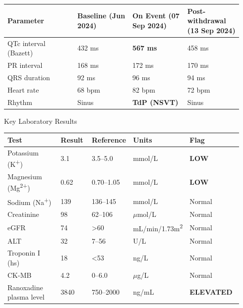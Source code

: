 \documentclass[11pt,a4paper]{scrartcl}
\begin{document}
\begin{tabular}{@{}L{0.28\linewidth}L{0.22\linewidth}L{0.22\linewidth}L{0.22\linewidth}@{}}
\toprule
{}
\small\bfseries Parameter & \small\bfseries Baseline (Jun 2024) & \small\bfseries On Event (07 Sep 2024) & \small\bfseries Post-withdrawal (13 Sep 2024) \\
\midrule
QTc interval (Bazett) & 432 ms & \textbf{\textcolor{AlertRed}{567 ms}} & 458 ms \\
PR interval & 168 ms & 172 ms & 170 ms \\
QRS duration & 92 ms & 96 ms & 94 ms \\
Heart rate & 68 bpm & 82 bpm & 72 bpm \\
Rhythm & Sinus & \textcolor{AlertRed}{\textbf{TdP (NSVT)}} & Sinus \\
\bottomrule
\end{tabular}

\vspace{4mm}

\begin{subsecbox}{Key Laboratory Results}
\end{subsecbox}
\vspace{2mm}

\begin{tabular}{@{}L{0.28\linewidth}L{0.14\linewidth}L{0.14\linewidth}L{0.14\linewidth}L{0.24\linewidth}@{}}
\toprule
{}
\small\bfseries Test & \small\bfseries Result & \small\bfseries Reference & \small\bfseries Units & \small\bfseries Flag \\
\midrule
Potassium (K\textsuperscript{+}) & 3.1 & 3.5--5.0 & mmol/L & \textcolor{AlertRed}{\bfseries LOW} \\
Magnesium (Mg\textsuperscript{2+}) & 0.62 & 0.70--1.05 & mmol/L & \textcolor{AlertRed}{\bfseries LOW} \\
Sodium (Na\textsuperscript{+}) & 139 & 136--145 & mmol/L & Normal \\
Creatinine & 98 & 62--106 & \(\mu\)mol/L & Normal \\
eGFR & 74 & {>}60 & mL/min/1.73m\textsuperscript{2} & Normal \\
ALT & 32 & 7--56 & U/L & Normal \\
Troponin I (hs) & 18 & {<}53 & ng/L & Normal \\
CK-MB & 4.2 & 0--6.0 & \(\mu\)g/L & Normal \\
Ranoxadine plasma level & 3840 & 750--2000 & ng/mL & \textcolor{AlertRed}{\bfseries ELEVATED} \\
\bottomrule
\end{tabular}
\end{document}

